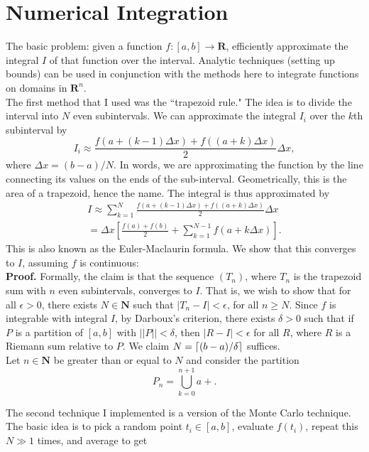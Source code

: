 \documentclass[11pt]{article}
\DeclarePairedDelimiter{\ceil}{\lceil}{\rceil}
\theoremstyle{plain}
\begin{document}
\section{Numerical Integration}
The basic problem: given a function $f:[a,b]\to\mathbf{R}$, efficiently approximate the integral $I$ of that function over the interval. Analytic techniques (setting up bounds) can be used in conjunction with the methods here to integrate functions on domains in $\mathbf{R}^n$.\\
\indent The first method that I used was the ``trapezoid rule." The idea is to divide the interval into $N$ even subintervals. We can approximate the integral $I_i$ over the $k$th subinterval by
\begin{equation*}
	I_i \approx \frac{f(a+(k-1)\Delta x) + f((a+k)\Delta x)}{2}\Delta x,
\end{equation*}
where $\Delta x = (b-a)/N$. In words, we are approximating the function by the line connecting its values on the ends of the sub-interval. Geometrically, this is the area of a trapezoid, hence the name. The integral is thus approximated by
\begin{align*}
	I \approx \sum_{k=1}^N \frac{f(a+(k-1)\Delta x) + f((a+k)\Delta x)}{2}\Delta x \\
	= \Delta x\left[\frac{f(a)+f(b)}{2} + \sum_{k=1}^{N-1} f(a + k\Delta x)\right].
\end{align*}
This is also known as the Euler-Maclaurin formula. We show that this converges to $I$, assuming $f$ is continuous:\\
\textbf{Proof.} Formally, the claim is that the sequence $(T_n)$, where $T_n$ is the trapezoid sum with $n$ even subintervals, converges to $I$. That is, we wish to show that for all $\epsilon>0$, there exists $N\in\mathbf{N}$ such that $|T_n-I|<\epsilon$, for all $n\geq N$. Since $f$ is integrable with integral $I$, by Darboux's criterion, there exists $\delta>0$ such that if $P$ is a partition of $[a,b]$ with $||P||<\delta$, then $|R-I|<\epsilon$ for all $R$, where $R$ is a Riemann sum relative to $P$. We claim $N=\ceil*{(b-a)/\delta}$ suffices. \\
Let $n\in\mathbf{N}$ be greater than or equal to $N$ and consider the partition 
\begin{equation*}
P_n = \bigcup_{k=0}^{n+1} a + .
\end{equation*}
\par 
The second technique I implemented is a version of the Monte Carlo technique. The basic idea is to pick a random point $t_i\in[a,b]$, evaluate $f(t_i)$, repeat this $N \gg 1$ times, and average to get
\end{document}

